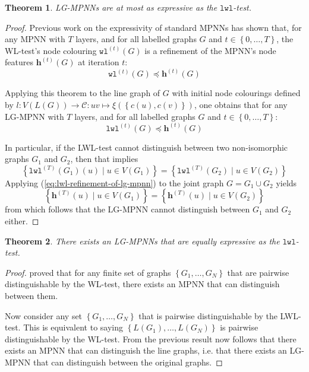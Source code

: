 \documentclass{article}
\newtheorem{theorem}{Theorem}
\newcommand{\set}[1]{\left\{#1\right\}}
\newcommand{\iter}[1]{^{(#1)}}
\newcommand{\wl}{\texttt{wl}}
\newcommand{\lwl}{\texttt{lwl}}
\newcommand{\dec}{\xi}
\newcommand{\bs}[1]{\boldsymbol{#1}}
\newcommand{\feat}{\bs{h}}
\newcommand{\mcc}{\mathcal{C}}
\begin{document}
\begin{theorem}
    LG-MPNNs are at most as expressive as the $\lwl$-test. 
\end{theorem}

\begin{proof}
    Previous work on the expressivity of standard MPNNs \cite{morris2019weisfeiler} has shown that, for any MPNN with $T$ layers, and for all labelled graphs $G$ and $t\in\set{0,\dots,T}$, the WL-test's node colouring $\wl\iter{t}(G)$ is a refinement of the MPNN's node features $\feat\iter{t}(G)$ at iteration $t$:
    \begin{equation}
        \wl\iter{t}(G) \preceq \feat\iter{t}(G)
    \end{equation}

    Applying this theorem to the line graph of $G$ with initial node colourings defined by $l: V(L(G)) \rightarrow \mcc: uv \mapsto \dec(\set{c(u),c(v)})$, one obtains that for any LG-MPNN with $T$ layers, and for all labelled graphs $G$ and $t\in\set{0,\dots,T}$:
    \begin{equation}    \label{eq:lwl-refinement-of-lg-mpnn}
        \lwl\iter{t}(G) \preceq \feat\iter{t}(G)
    \end{equation}

    In particular, if the LWL-test cannot distinguish between two non-isomorphic graphs $G_1$ and $G_2$, then that implies
    \begin{equation}
        \set{\lwl\iter{T}(G_1)(u) \mid u\in V(G_1)} = \set{\lwl\iter{T}(G_2) \mid u\in V(G_2)}
    \end{equation}
    Applying (\ref{eq:lwl-refinement-of-lg-mpnn}) to the joint graph $G=G_1\cup G_2$ yields 
    \begin{equation}
        \set{\feat\iter{T}(u) \mid u\in V(G_1)} = \set{\feat\iter{T}(u) \mid u\in V(G_2)}
    \end{equation}
    from which follows that the LG-MPNN cannot distinguish between $G_1$ and $G_2$ either.
\end{proof}

\begin{theorem}
    There exists an LG-MPNNs that are equally expressive as the $\lwl$-test.
\end{theorem}

\begin{proof}
    \cite{xu2018powerful} proved that for any finite set of graphs $\set{G_1, \dots, G_N}$ that are pairwise distinguishable by the WL-test, there exists an MPNN that can distinguish between them.

    Now consider any set $\set{G_1, \dots, G_N}$ that is pairwise distinguishable by the LWL-test. This is equivalent to saying $\set{L(G_1), \dots, L(G_N)}$ is pairwise distinguishable by the WL-test. From the previous result now follows that there exists an MPNN that can distinguish the line graphs, i.e. that there exists an LG-MPNN that can distinguish between the original graphs.
\end{proof}
\end{document}

